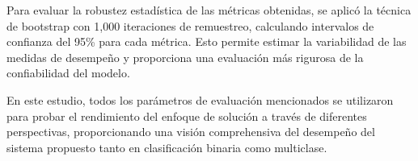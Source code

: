Para evaluar la robustez estadística de las métricas obtenidas, se aplicó la técnica de bootstrap con 1,000 iteraciones de remuestreo, calculando intervalos de confianza del 95\% para cada métrica. Esto permite estimar la variabilidad de las medidas de desempeño y proporciona una evaluación más rigurosa de la confiabilidad del modelo.

En este estudio, todos los parámetros de evaluación mencionados se utilizaron para probar el rendimiento del enfoque de solución a través de diferentes perspectivas, proporcionando una visión comprehensiva del desempeño del sistema propuesto tanto en clasificación binaria como multiclase.
